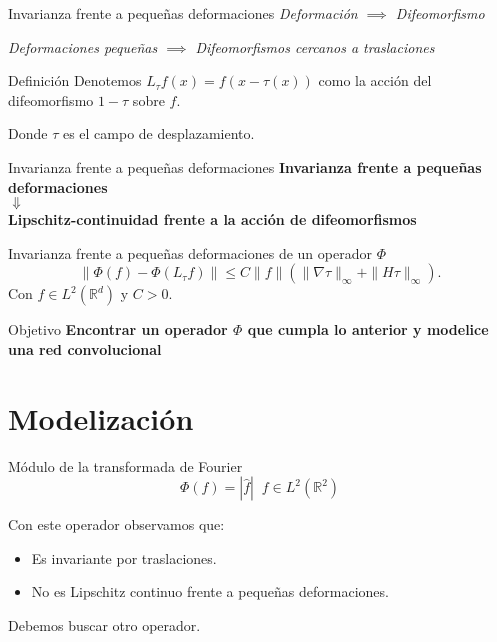 \documentclass[aspectratio=43]{beamer}
\begin{document}
  \begin{frame}[t]{Invarianza frente a pequeñas deformaciones}
    \textcolor{tudCyan}{\textit{Deformación $\implies$ Difeomorfismo}}

    \textcolor{tudCyan}{\textit{Deformaciones pequeñas $\implies$ Difeomorfismos cercanos a traslaciones}}  

    \begin{block}{Definición}
      Denotemos $L_{\tau} f(x)=f(x-\tau(x))$ como la acción del difeomorfismo $1-\tau$ sobre $f$.

      Donde $\tau$ es el campo de desplazamiento. 
    \end{block}

  \end{frame}

  \begin{frame}{Invarianza frente a pequeñas deformaciones}
    \textcolor{tudCyan}{\textbf{\centering Invarianza frente a pequeñas deformaciones \\ \centering $\Downarrow$ \\ \centering Lipschitz-continuidad frente a la acción de difeomorfismos}}  

    \begin{block}{Invarianza frente a pequeñas deformaciones de un operador $\Phi$}
      \begin{equation*}
        \| \Phi(f)-\Phi(L_{\tau}f)\|\leq C\|f\|(\|\nabla\tau\|_{\infty} + \|H \tau\|_\infty).
      \end{equation*}
      Con $f\in L^2(\mathbb{R}^d)$ y $C>0$.
    \end{block}
  \end{frame}


  \begin{frame}{Objetivo}
    \centering \LARGE \textcolor{tudCyan}{\textbf{Encontrar un operador $\Phi$ que cumpla lo anterior y modelice una red convolucional}}
  \end{frame}

\section{Modelización}

\begin{frame}{Módulo de la transformada de Fourier}
  $$\Phi(f)=|\widehat{f}| \;\; f\in L^2(\mathbb{R}^2)$$

  Con este operador observamos que: 
  \begin{itemize}
    \item Es invariante por traslaciones.
    \item No es Lipschitz continuo frente a pequeñas deformaciones.
  \end{itemize}

  Debemos buscar otro operador.
\end{frame}
\end{document}
